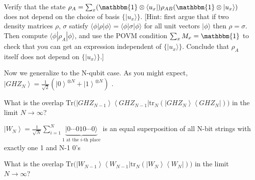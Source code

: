 \documentclass[a4paper,10pt,landscape,twocolumn]{scrartcl}
\newcommand{\ket}[1]{| #1 \rangle}
\newcommand{\bra}[1]{\langle #1 |}
\begin{document}
\begin{exercise}
Verify that the state $\rho_A=\sum_x (\mathbbm{1}\otimes \bra{u_x})\rho_{AB}(\mathbbm{1}\otimes \ket{u_x})$ does not depend on the choice of
basis $\{\ket{u_x}\}$. [Hint: first argue that if two density matrices $\rho$, $\sigma$ satisfy $\bra{\phi}\rho\ket{\phi}=\bra{\phi}\sigma\ket{\phi}$ 
for all unit vectors $\ket{\phi}$ then $\rho=\sigma$. Then compute $\bra{\phi}\rho_A\ket{\phi}$, and use the POVM condition
$\sum_x M_x=\mathbbm{1}$ to check that you can get an expression independent of $\{\ket{u_x}\}$. Conclude that $\rho_A$
itself does not depend on $\{\ket{u_x}\}$.]
\end{exercise}


\begin{exercise}
\begin{subex}
 Now we generalize to the N-qubit case. As you might expect, $\left| GHZ_ N \right\rangle =\frac{1}{\sqrt {2}} (\left| 0 \right\rangle ^{\otimes N}+\left| 1 \right\rangle ^{\otimes N})$ .

What is the overlap $\text {Tr}\Big(\left| GHZ_{N-1} \right\rangle\left\langle {GHZ_{N-1}}\right| \text {tr}_ N\left(\left| GHZ_ N \right\rangle \left\langle GHZ_ N \right|\right)\Big)$ in the limit $N \rightarrow \infty$? 
\end{subex}

\begin{subex}
$\left| W_ N \right\rangle= \frac{1}{\sqrt{N}}\sum_{i=1}^N \underset{1\text{ at the $i$-th place}}{\underbrace{\ket{0\cdots 010\cdots 0}}}$ is an equal superposition of all N-bit strings with exactly one 1 and N-1 0's

What is the overlap $\text {Tr}\Big(\left| W_{N-1} \right\rangle \left\langle {W_{N-1}}\right| \text {tr}_ N\left(\left| W_ N \right\rangle \left\langle W_N \right|\right)\Big)$ in the limit $N \rightarrow \infty$? 
\end{subex}
\end{exercise}
\end{document}
